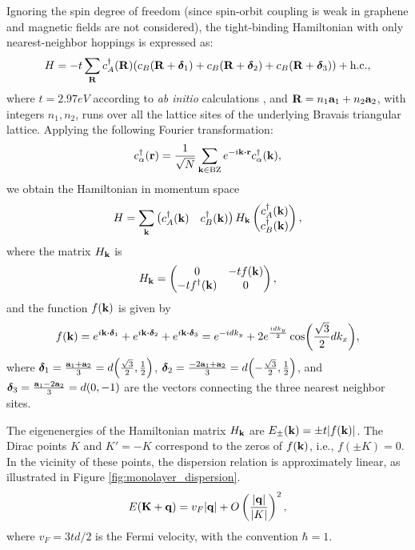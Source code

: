 Ignoring the spin degree of freedom (since spin-orbit coupling is weak in graphene and magnetic fields are not considered), the tight-binding Hamiltonian with only nearest-neighbor hoppings is expressed as:
\begin{equation} \label{eq:monolayer-tight-binding}
H = -t \sum_{{\vb{R}}} c^{\dagger}_A({\vb{R}}) \qty(c_B({\vb{R}} + {\bm{\delta}}_1) + c_B({\vb{R}}+{\bm{\delta}}_2) + c_B({\vb{R}}+{\bm{\delta}}_3)) + {\text{h.c.}},
\end{equation}
where $t = 2.97 \unit{eV}$ according to \textit{ab initio} calculations \cite{handbook2019}, and \({\vb{R}} = n_1 {\vb{a}}_1 + n_2 {\vb{a}}_2\), with integers \(n_1, n_2\), runs over all the lattice sites of the underlying Bravais triangular lattice. Applying the following Fourier transformation:
\begin{equation} \label{eq:monolayer-fourier}
c_{\alpha}^\d(\r) = \frac{1}{\sqrt{N}} \sum_{\k \in \text{BZ}} e^{-i \k \vdot \r} c_\alpha^\d(\k),
\end{equation}
we obtain the Hamiltonian in momentum space
\begin{equation} \label{eq:monolayer-tight-binding2}
H = \sum_{{\vb{k}}}
\begin{pmatrix}
c_A^{\dagger}({\vb{k}}) & c_B^{\dagger}({\vb{k}})
\end{pmatrix}
H_{\vb{k}}
\begin{pmatrix}
c_A^{\dagger}({\vb{k}}) \\ c_B^{\dagger}({\vb{k}})
\end{pmatrix},
\end{equation}
where the matrix \(H_{\vb{k}}\) is
\begin{equation} \label{eq:hamiltonian_k_monolayer}
H_{\vb{k}} =
\begin{pmatrix}
0 & -t f({\vb{k}}) \\
-t f^{\dagger}({\vb{k}}) & 0
\end{pmatrix},
\end{equation}
and the function \(f({\vb{k}})\) is given by
\begin{equation} \label{eq:monolayer-fk}
f(\k) = e^{i \k \vdot \bm{\delta}_1} + e^{i \k \vdot \bm{\delta}_2} + e^{i \k \vdot \bm{\delta}_3} =
e^{-idk_y} + 2 e^{\frac{idk_y}{2}} \cos(\frac{\sqrt{3}}{2} dk_x),
\end{equation}
where \(\bm{\delta}_1 = \frac{{\vb{a}}_1 + {\vb{a}}_2}{3} = d \qty(\frac{\sqrt{3}}{2}, \frac{1}{2})\), \(\bm{\delta}_2 = \frac{-2 {\vb{a}}_1 + {\vb{a}}_2}{3} = d \qty(-\frac{\sqrt{3}}{2}, \frac{1}{2})\), and \(\bm{\delta}_3 = \frac{{\vb{a}}_1 - 2 {\vb{a}}_2}{3} = d \qty(0, -1)\) are the vectors connecting the three nearest neighbor sites.

The eigenenergies of the Hamiltonian matrix \(H_{\vb{k}}\) are \(E_\pm({\vb{k}}) = \pm t \abs{f({\vb{k}})}\). The Dirac points \(K\) and \(K' = -K\) correspond to the zeros of \(f({\vb{k}})\), i.e., \(f(\pm K) = 0\). In the vicinity of these points, the dispersion relation is approximately linear, as illustrated in Figure \ref{fig:monolayer_dispersion}.
\begin{equation} \label{eq:linear_Ek_monolayer}
E({\vb{K}} + {\vb{q}}) = v_F \abs{{\vb{q}}} + O\left(\frac{\abs{{\vb{q}}}}{\abs{K}}\right)^2,
\end{equation}
where \(v_F = 3td/2\) is the Fermi velocity, with the convention \(\hbar = 1\).

